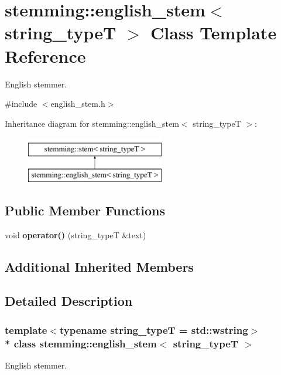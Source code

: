 \section{stemming\+:\+:english\+\_\+stem$<$ string\+\_\+typeT $>$ Class Template Reference}
\label{classstemming_1_1english__stem}


English stemmer.  




{\ttfamily \#include $<$english\+\_\+stem.\+h$>$}

Inheritance diagram for stemming\+:\+:english\+\_\+stem$<$ string\+\_\+typeT $>$\+:\begin{figure}[H]
\begin{center}
\leavevmode
\includegraphics[height=2.000000cm]{classstemming_1_1english__stem}
\end{center}
\end{figure}
\subsection*{Public Member Functions}
\begin{DoxyCompactItemize}
\item 
void {\bf operator()} (string\+\_\+typeT \&text)
\end{DoxyCompactItemize}
\subsection*{Additional Inherited Members}


\subsection{Detailed Description}
\subsubsection*{template$<$typename string\+\_\+typeT = std\+::wstring$>$\\*
class stemming\+::english\+\_\+stem$<$ string\+\_\+type\+T $>$}

English stemmer. 

